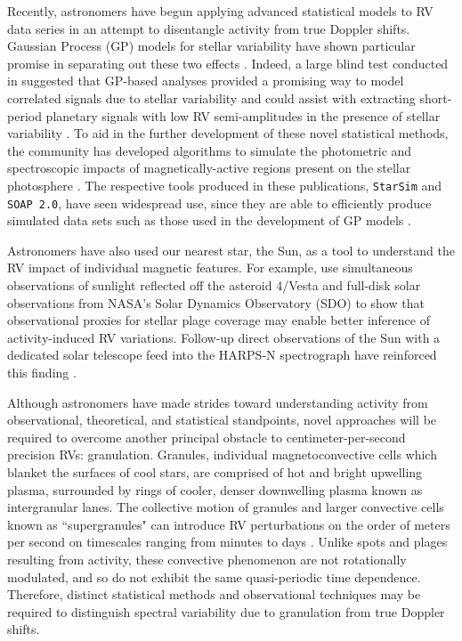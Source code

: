 \documentclass[twocolumn]{aastex63}
\newcommand{\revise}[1]{#1}
\begin{document}
Recently, astronomers have begun applying advanced statistical models to RV data series in an attempt to disentangle activity from true Doppler shifts. Gaussian Process (GP) models for stellar variability have shown particular promise in separating out these two effects \citep[e.g.,][]{Haywood2014, Rajpaul2015,Jones2017}. \revise{Indeed, a large blind test conducted in \citet{Dumusque2017} suggested that GP-based analyses provided a promising way to model correlated signals due to stellar variability and could assist with extracting short-period planetary signals with low RV semi-amplitudes in the presence of stellar variability \citep{Dumusque2016}.} To aid in the \revise{further} development of these novel statistical methods, the community has developed algorithms to simulate the photometric and spectroscopic impacts of magnetically-active regions present on the stellar photosphere \citep[e.g.,][]{Herrero2016, Boisse2012, Dumusque2014}. The respective tools produced in these publications, \texttt{StarSim} and \texttt{SOAP 2.0}, have seen widespread use, since they are able to efficiently produce simulated data sets such as those used in the development of GP models \citep[e.g.,][]{Rajpaul2015, Jones2017, Gilbertson2020}. \par

Astronomers have also used our nearest star, the Sun, as a tool to understand the RV impact of individual magnetic features. For example, \citet{Haywood2016} use simultaneous observations of sunlight reflected off the asteroid 4/Vesta and full-disk solar observations from NASA's Solar Dynamics Observatory (SDO) to show that observational proxies for stellar plage coverage may enable better inference of activity-induced RV variations. Follow-up direct observations of the Sun with a dedicated solar telescope \revise{feed into the HARPS-N spectrograph \citep{Dumusque2015, Phillips2016, CollierCameron2019}} have reinforced this finding \citep{Milbourne2019}. \par

Although astronomers have made strides toward understanding activity from observational, theoretical, and statistical standpoints, novel approaches will be required to overcome another principal obstacle to centimeter-per-second precision RVs: granulation. Granules, individual magnetoconvective cells which blanket the surfaces of cool stars, are comprised of hot and bright upwelling plasma, surrounded by rings of cooler, denser downwelling plasma known as intergranular lanes. The collective motion of granules and larger convective cells known as ``supergranules" can introduce RV perturbations on the order of meters per second on timescales ranging from minutes to days \revise{\citep{Rieutord2010, Rincon2018}}. Unlike spots and plages resulting from activity, these convective phenomenon are not rotationally modulated, and so do not exhibit the same quasi-periodic time dependence. Therefore, distinct statistical methods and observational techniques may be required to distinguish spectral variability due to granulation from true Doppler shifts. \par 
\end{document}
